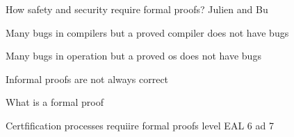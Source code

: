{\color{red} How safety and security require formal proofs?
  Julien and Bu

  Many bugs in compilers but a proved compiler does not have bugs

Many bugs in operation but a proved os does not have bugs

 Informal proofs are not always correct

    What is a formal proof

    Certfification processes requiire formal proofs level EAL 6 ad 7}






